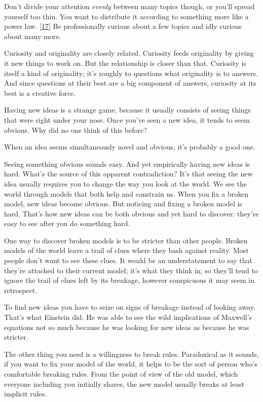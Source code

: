 Don't divide your attention \emph{evenly} between many topics though, or
you'll spread yourself too thin. You want to distribute it according to
something more like a power law. {[}\hyperref[f17n]{17}{]} Be
professionally curious about a few topics and idly curious about many
more.

Curiosity and originality are closely related. Curiosity feeds
originality by giving it new things to work on. But the relationship is
closer than that. Curiosity is itself a kind of originality; it's
roughly to questions what originality is to answers. And since questions
at their best are a big component of answers, curiosity at its best is a
creative force.

Having new ideas is a strange game, because it usually consists of
seeing things that were right under your nose. Once you've seen a new
idea, it tends to seem obvious. Why did no one think of this before?

When an idea seems simultaneously novel and obvious, it's probably a
good one.

Seeing something obvious sounds easy. And yet empirically having new
ideas is hard. What's the source of this apparent contradiction? It's
that seeing the new idea usually requires you to change the way you look
at the world. We see the world through models that both help and
constrain us. When you fix a broken model, new ideas become obvious. But
noticing and fixing a broken model is hard. That's how new ideas can be
both obvious and yet hard to discover: they're easy to see after you do
something hard.

One way to discover broken models is to be stricter than other people.
Broken models of the world leave a trail of clues where they bash
against reality. Most people don't want to see these clues. It would be
an understatement to say that they're attached to their current model;
it's what they think in; so they'll tend to ignore the trail of clues
left by its breakage, however conspicuous it may seem in retrospect.

To find new ideas you have to seize on signs of breakage instead of
looking away. That's what Einstein did. He was able to see the wild
implications of Maxwell's equations not so much because he was looking
for new ideas as because he was stricter.

The other thing you need is a willingness to break rules. Paradoxical as
it sounds, if you want to fix your model of the world, it helps to be
the sort of person who's comfortable breaking rules. From the point of
view of the old model, which everyone including you initially shares,
the new model usually breaks at least implicit rules.

